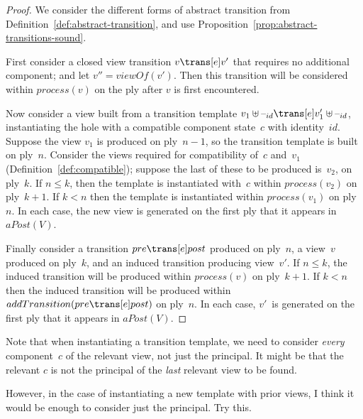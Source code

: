 
\begin{proof}
We consider the different forms of abstract transition from
Definition~\ref{def:abstract-transition}, and use
Proposition~\ref{prop:abstract-transitions-sound}. 

First consider a closed view transition $v \trans[e] v'$ that requires no
additional component; and let $v'' = viewOf(v')$.  Then this transition will
be considered within $process(v)$ on the ply after $v$ is first encountered.

Now consider a view built from a transition template $v_1 \uplus \hole{id}
\trans[e] v_1' \uplus \hole{id}$, instantiating the hole with a compatible
component state~$c$ with identity~$id$.  Suppose the view $v_1$ is produced
on ply~$n-1$, so the transition template is built on ply~$n$.  Consider the
views required for compatibility of~$c$ and~$v_1$
(Definition~\ref{def:compatible}); suppose the last of these to be produced
is~$v_2$, on ply~$k$.
If $n \le k$, then the template is instantiated with~$c$ within $process(v_2)$
on ply~$k+1$.  If $k < n$ then the template is instantiated within
$process(v_1)$ on ply~$n$.  In each case, the new view is generated on the
first ply that it appears in $aPost(V)$.

Finally consider a transition $pre \trans[e] post$ produced on ply~$n$, a
view~$v$ produced on ply~$k$, and an induced transition producing view~$v'$.
If $n \le k$, the induced transition will be produced within $process(v)$ on
ply~$k+1$.  If $k < n$ then the induced transition will be produced within
$addTransition(pre \trans[e] post)$ on ply~$n$.  In each case, $v'$~is
generated on the first ply that it appears in $aPost(V)$.
\end{proof}

Note that when instantiating a transition template, we need to
consider \emph{every} component~$c$ of the relevant view, not just the
principal.  It might be that the relevant $c$ is not the principal of the
\emph{last} relevant view to be found.
\begin{improve}
However, in the case of instantiating a new template with prior views, I think
it would be enough to consider just the principal.  Try this.
\end{improve}
